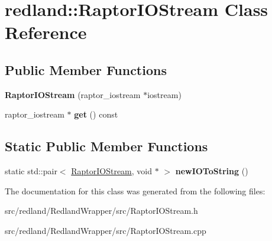 \hypertarget{classredland_1_1RaptorIOStream}{}\section{redland\+:\+:Raptor\+I\+O\+Stream Class Reference}
\label{classredland_1_1RaptorIOStream}
\subsection*{Public Member Functions}
\begin{DoxyCompactItemize}
\item 
\mbox{\label{classredland_1_1RaptorIOStream_a6cf2e1a9cf6c31bb37069c5b3e591509}} 
{\bfseries Raptor\+I\+O\+Stream} (raptor\+\_\+iostream $\ast$iostream)
\item 
\mbox{\label{classredland_1_1RaptorIOStream_adbcfcc29e030219dfd180ecb3d6c2c4b}} 
raptor\+\_\+iostream $\ast$ {\bfseries get} () const
\end{DoxyCompactItemize}
\subsection*{Static Public Member Functions}
\begin{DoxyCompactItemize}
\item 
\mbox{\label{classredland_1_1RaptorIOStream_ab4b78aede5b54be5a654c9b81e65452c}} 
static std\+::pair$<$ \hyperlink{classredland_1_1RaptorIOStream}{Raptor\+I\+O\+Stream}, void $\ast$ $>$ {\bfseries new\+I\+O\+To\+String} ()
\end{DoxyCompactItemize}


The documentation for this class was generated from the following files\+:\begin{DoxyCompactItemize}
\item 
src/redland/\+Redland\+Wrapper/src/Raptor\+I\+O\+Stream.\+h\item 
src/redland/\+Redland\+Wrapper/src/Raptor\+I\+O\+Stream.\+cpp\end{DoxyCompactItemize}
